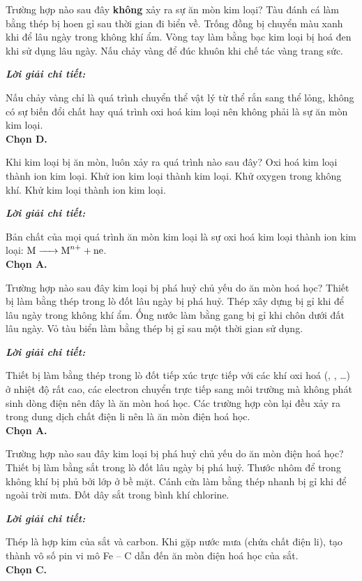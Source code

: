 \documentclass[11pt,a4paper]{article}
\def\loigiai#1{
\par\begingroup\color{blue!80!black}\small
\noindent\textbf{\textit{Lời giải chi tiết:}}\par
#1\par\endgroup}
\begin{document}
\begin{ex}
Trường hợp nào sau đây \textbf{không} xảy ra sự ăn mòn kim loại?
\choice
{Tàu đánh cá làm bằng thép bị hoen gỉ sau thời gian đi biển về.}
{Trống đồng bị chuyển màu xanh khi để lâu ngày trong không khí ẩm.}
{Vòng tay làm bằng bạc kim loại bị hoá đen khi sử dụng lâu ngày.}
{\True Nấu chảy vàng để đúc khuôn khi chế tác vàng trang sức.}
\loigiai{
Nấu chảy vàng chỉ là quá trình chuyển thể vật lý từ thể rắn sang thể lỏng, không có sự biến đổi chất hay quá trình oxi hoá kim loại nên không phải là sự ăn mòn kim loại.\\
\textbf{Chọn D.}}
\end{ex}

\begin{ex}
Khi kim loại bị ăn mòn, luôn xảy ra quá trình nào sau đây?
\choice
{\True Oxi hoá kim loại thành ion kim loại.}
{Khử ion kim loại thành kim loại.}
{Khử oxygen trong không khí.}
{Khử kim loại thành ion kim loại.}
\loigiai{
Bản chất của mọi quá trình ăn mòn kim loại là sự oxi hoá kim loại thành ion kim loại: $\ce{M -> M^{n+} + ne}$.\\
\textbf{Chọn A.}}
\end{ex}

\begin{ex}
Trường hợp nào sau đây kim loại bị phá huỷ chủ yếu do ăn mòn hoá học?
\choice
{\True Thiết bị làm bằng thép trong lò đốt lâu ngày bị phá huỷ.}
{Thép xây dựng bị gỉ khi để lâu ngày trong không khí ẩm.}
{Ống nước làm bằng gang bị gỉ khi chôn dưới đất lâu ngày.}
{Vỏ tàu biển làm bằng thép bị gỉ sau một thời gian sử dụng.}
\loigiai{
Thiết bị làm bằng thép trong lò đốt tiếp xúc trực tiếp với các khí oxi hoá (\ce{O2}, \ce{CO2}, \ce{SO2}\dots) ở nhiệt độ rất cao, các electron chuyển trực tiếp sang môi trường mà không phát sinh dòng điện nên đây là ăn mòn hoá học. Các trường hợp còn lại đều xảy ra trong dung dịch chất điện li nên là ăn mòn điện hoá học.\\
\textbf{Chọn A.}}
\end{ex}

\begin{ex}
Trường hợp nào sau đây kim loại bị phá huỷ chủ yếu do ăn mòn điện hoá học?
\choice
{Thiết bị làm bằng sắt trong lò đốt lâu ngày bị phá huỷ.}
{Thước nhôm để trong không khí bị phủ bởi lớp  ở bề mặt.}
{\True Cánh cửa làm bằng thép nhanh bị gỉ khi để ngoài trời mưa.}
{Đốt dây sắt trong bình khí chlorine.}
\loigiai{
Thép là hợp kim của sắt và carbon. Khi gặp nước mưa (chứa chất điện li), tạo thành vô số pin vi mô Fe -- C dẫn đến ăn mòn điện hoá học của sắt.\\
\textbf{Chọn C.}}
\end{ex}
\end{document}
